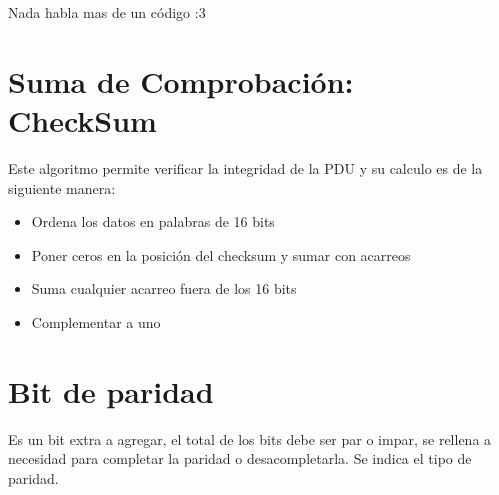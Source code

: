 \documentclass[12pt, fleqn]{report}                             %
\theoremstyle{break}                                            %
\begin{document}
            Nada habla mas de un código :3

            

        


    
        \clearpage
        \section{Suma de Comprobación: CheckSum}

            Este algoritmo permite verificar la integridad de la PDU y su calculo es de la siguiente manera:

            \begin{itemize}
                \item Ordena los datos en palabras de 16 bits
                \item Poner ceros en la posición del checksum y sumar con acarreos
                \item Suma cualquier acarreo fuera de los 16 bits
                \item Complementar a uno
            \end{itemize}





        \section{Bit de paridad}
        Es un bit extra a agregar, el total de los bits debe ser par o impar, se rellena a necesidad para completar la paridad o desacompletarla.
        Se indica el tipo de paridad.






\end{document}
